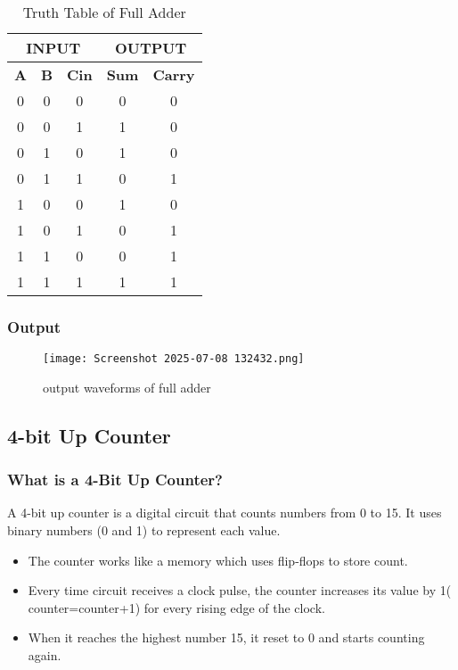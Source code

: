 \documentclass[12pt]{article}
\begin{document}
\begin{table}[H]
\centering
\begin{tabular}{|c|c|c|c|c|}
\hline
\multicolumn{3}{|c|}{\textbf{INPUT}} & \multicolumn{2}{c|}{\textbf{OUTPUT}} \\ \hline
\textbf{A} & \textbf{B} & \textbf{Cin} & \textbf{Sum} & \textbf{Carry} \\ \hline
0 & 0 & 0 & 0 & 0 \\ \hline
0 & 0 & 1 & 1 & 0 \\ \hline
0 & 1 & 0 & 1 & 0 \\ \hline
0 & 1 & 1 & 0 & 1 \\ \hline
1 & 0 & 0 & 1 & 0 \\ \hline
1 & 0 & 1 & 0 & 1 \\ \hline
1 & 1 & 0 & 0 & 1 \\ \hline
1 & 1 & 1 & 1 & 1 \\ \hline
\end{tabular}
\caption{Truth Table of Full Adder}
\end{table}

\subsubsection{Output}
\begin{figure}[H]
    \centering 
    \texttt{[image: Screenshot 2025-07-08 132432.png]}
    \caption{output waveforms of full adder}
    \label{fig:enter-label}
\end{figure}

\subsection{4-bit Up Counter}
\subsubsection{What is a 4-Bit Up Counter?}
A 4-bit up counter is a digital circuit that counts numbers from 0 to 15.  It uses binary numbers (0 and 1) to represent each value.

\begin{itemize}
    \item The counter works like a memory which uses flip-flops to store count.

    \item Every time circuit receives a clock pulse, the counter increases its value by 1( counter=counter+1) for every rising edge of the clock.
    
    \item When it reaches the highest number 15, it reset to 0 and starts counting again.
    
    \end{itemize}
\end{document}
